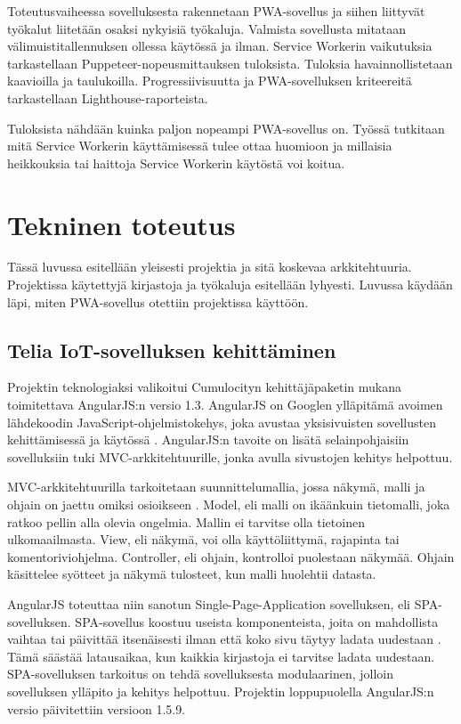 \documentclass{tktltiki}
\begin{document}
Toteutusvaiheessa sovelluksesta rakennetaan PWA-sovellus ja siihen liittyvät työkalut liitetään osaksi nykyisiä työkaluja. Valmista sovellusta mitataan välimuistitallennuksen ollessa käytössä ja ilman. Service Workerin vaikutuksia tarkastellaan Puppeteer-nopeusmittauksen tuloksista. Tuloksia havainnollistetaan kaavioilla ja taulukoilla. Progressiivisuutta ja PWA-sovelluksen kriteereitä tarkastellaan Lighthouse-raporteista.

Tuloksista nähdään kuinka paljon nopeampi PWA-sovellus on. Työssä tutkitaan mitä Service Workerin käyttämisessä tulee ottaa huomioon ja millaisia heikkouksia tai haittoja Service Workerin käytöstä voi koitua.

\newpage
\section{Tekninen toteutus}

Tässä luvussa esitellään yleisesti projektia ja sitä koskevaa arkkitehtuuria. Projektissa käytettyjä kirjastoja ja työkaluja esitellään lyhyesti. Luvussa käydään läpi, miten PWA-sovellus otettiin projektissa käyttöön.

\subsection{Telia IoT-sovelluksen kehittäminen}

Projektin teknologiaksi valikoitui Cumulocityn kehittäjäpaketin mukana toimitettava AngularJS:n versio 1.3. AngularJS on Googlen ylläpitämä avoimen lähdekoodin JavaScript-ohjelmistokehys, joka avustaa yksisivuisten sovellusten kehittämisessä ja käytössä \cite{jain2015angularjs}. AngularJS:n tavoite on lisätä selainpohjaisiin sovelluksiin tuki MVC-arkkitehtuurille, jonka avulla sivustojen kehitys helpottuu. 

MVC-arkkitehtuurilla tarkoitetaan suunnittelumallia, jossa näkymä, malli ja ohjain on jaettu omiksi osioikseen \cite{deacon2009model}. Model, eli malli on ikäänkuin tietomalli, joka ratkoo pellin alla olevia ongelmia. Mallin ei tarvitse olla tietoinen ulkomaailmasta. View, eli näkymä,  voi olla käyttöliittymä, rajapinta tai komentoriviohjelma. Controller, eli ohjain, kontrolloi puolestaan näkymää. Ohjain käsittelee syötteet ja näkymä tulosteet, kun malli huolehtii datasta. 

AngularJS toteuttaa niin sanotun Single-Page-Application sovelluksen, eli SPA-sovelluksen. SPA-sovellus koostuu useista komponenteista, joita on mahdollista vaihtaa tai päivittää itsenäisesti ilman että koko sivu täytyy ladata uudestaan \cite{jadhav2015single}. Tämä säästää latausaikaa, kun kaikkia kirjastoja ei tarvitse ladata uudestaan. SPA-sovelluksen tarkoitus on tehdä sovelluksesta modulaarinen, jolloin sovelluksen ylläpito ja kehitys helpottuu. Projektin loppupuolella AngularJS:n versio päivitettiin versioon 1.5.9.
\end{document}
